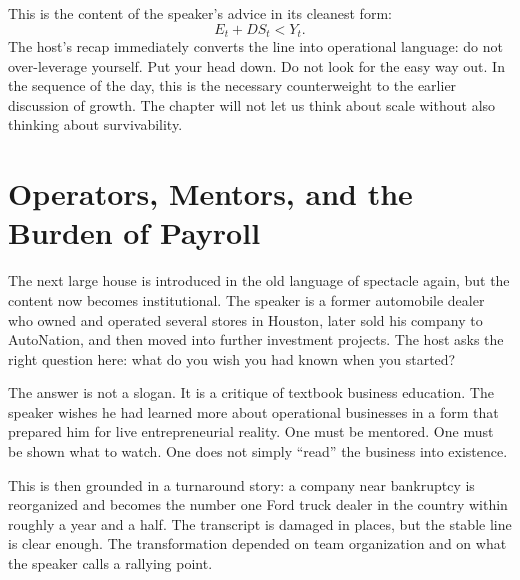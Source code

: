 This is the content of the speaker's advice in its cleanest form:
\begin{equation}
E_t + DS_t < Y_t.
\end{equation}
The host's recap immediately converts the line into operational language: do not over-leverage yourself. Put your head down. Do not look for the easy way out. In the sequence of the day, this is the necessary counterweight to the earlier discussion of growth. The chapter will not let us think about scale without also thinking about survivability.

\begin{figure}
\centering
{}
\end{figure}

\section{Operators, Mentors, and the Burden of Payroll}

The next large house is introduced in the old language of spectacle again, but the content now becomes institutional. The speaker is a former automobile dealer who owned and operated several stores in Houston, later sold his company to AutoNation, and then moved into further investment projects. The host asks the right question here: what do you wish you had known when you started?

The answer is not a slogan. It is a critique of textbook business education. The speaker wishes he had learned more about operational businesses in a form that prepared him for live entrepreneurial reality. One must be mentored. One must be shown what to watch. One does not simply ``read'' the business into existence.

This is then grounded in a turnaround story: a company near bankruptcy is reorganized and becomes the number one Ford truck dealer in the country within roughly a year and a half. The transcript is damaged in places, but the stable line is clear enough. The transformation depended on team organization and on what the speaker calls a rallying point.

